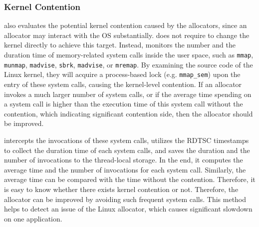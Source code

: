 \subsubsection{Kernel Contention}
\MP{} also evaluates the potential kernel contention caused by the allocators, since an allocator may interact with the OS substantially. \MP{} does not require to change the kernel directly to achieve this target. Instead, \MP{} monitors the number and the duration time of memory-related system calls inside the user space, such as \texttt{mmap}, \texttt{munmap}, \texttt{madvise}, \texttt{sbrk}, \texttt{madvise}, or \texttt{mremap}. By examining the source code of the Linux kernel, they will acquire a process-based lock (e.g. \texttt{mmap\_sem}) upon the entry of these system calls, causing the kernel-level contention. If an allocator invokes a much larger number of system calls, or if the average time spending on a system call is higher than the execution time of this system call without the contention, which indicating significant contention side, then the allocator should be improved. 

\MP{} intercepts the invocations of these system calls, utilizes the RDTSC timestamps to collect the duration time of each system calls, and saves the duration and the number of invocations to the thread-local storage. In the end, it computes the average time and the number of invocations for each system call. Similarly, the average time can be compared with the time without the contention. Therefore, it is easy to know whether there exists kernel contention or not. Therefore, the allocator can be improved by avoiding such frequent system calls. This method helps to detect an issue of the Linux allocator, which causes significant slowdown on one application. 

  


